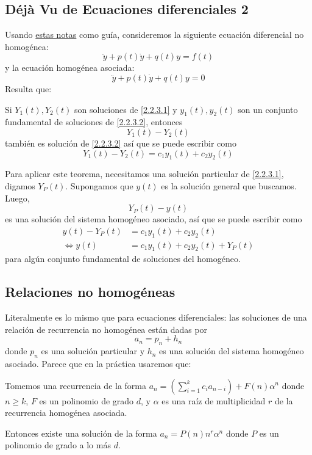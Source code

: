 \documentclass[spanish]{book}
\theoremstyle{definition}
\begin{document}
\subsection{Déjà Vu de Ecuaciones diferenciales 2}
Usando \href{https://tutorial.math.lamar.edu/Classes/DE/NonhomogeneousDE.aspx#mjx-eqn-eqeq1}{estas notas} como guía, consideremos la siguiente ecuación diferencial no homogénea:
\begin{equation}\label{2.2.3.1}
	\ddot{y}+p(t)\dot{y}+q(t)y=f(t)
\end{equation}
y la ecuación homogénea asociada:
\begin{equation}\label{2.2.3.2}
	\ddot{y}+p(t)\dot{y}+q(t)y=0
\end{equation}
Resulta que:
\begin{teo}
	Si $Y_1(t), Y_2(t)$ son soluciones de \eqref{2.2.3.1} y $y_1(t),y_2(t)$ son un conjunto fundamental de soluciones de \eqref{2.2.3.2}, entonces
	\[Y_1(t)-Y_2(t)\]
	también es solución de \eqref{2.2.3.2} así que se puede escribir como
	\[Y_1(t)-Y_2(t)=c_1y_1(t)+c_2y_2(t)\]
\end{teo}
	Para aplicar este teorema, necesitamos una solución particular de \eqref{2.2.3.1}, digamos $Y_P(t)$. Supongamos que $y(t)$ es la solución general que buscamos. Luego,
	\[Y_P(t)-y(t)\]
	es una solución del sistema homogéneo asociado, así que se puede escribir como 
	\begin{align*}
		y(t)-Y_P(t)&=c_1y_1(t)+c_2y_2(t)\\
	\iff y(t)&=c_1y_1(t)+c_2y_2(t)+Y_P(t)
	\end{align*}
	para algún conjunto fundamental de soluciones del homogéneo.
\subsection{Relaciones no homogéneas}
	Literalmente es lo mismo que para ecuaciones diferenciales: las soluciones de una relación de recurrencia no homogénea están dadas por
	\[a_n=p_n+h_n\]
	donde $p_n$ es una solución particular y $h_n$ es una solución del sistema homogéneo asociado.
	Parece que en la práctica usaremos que:
	\begin{teo}
		Tomemos una recurrencia de la forma $a_n=(\sum_{i=1}^kc_ia_{n-i})+F(n)\alpha^n$ donde $n\geq k$, $F$ es un polinomio de grado $d$, y $\alpha$ es una raíz de multiplicidad $r$ de la recurrencia homogénea asociada.
		
		Entonces existe una solución de la forma $a_n=P(n)n^r\alpha^n$ donde $P$ es un polinomio de grado a lo más $d$.
	\end{teo}
\end{document}
